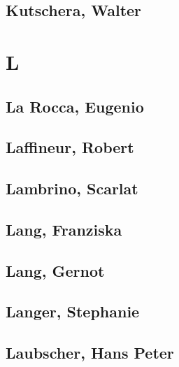 \subsection[Kutschera, Walter (1)]{Kutschera, Walter}

\section{L}

\subsection[La Rocca, Eugenio (1)]{La Rocca, Eugenio}

\subsection[Laffineur, Robert (1)]{Laffineur, Robert}

\subsection[Lambrino, Scarlat (1)]{Lambrino, Scarlat}

\subsection[Lang, Franziska (1)]{Lang, Franziska}

\subsection[Lang, Gernot (1)]{Lang, Gernot}

\subsection[Langer, Stephanie (2)]{Langer, Stephanie}


\subsection[Laubscher, Hans Peter (1)]{Laubscher, Hans Peter}

